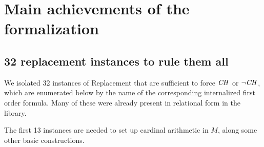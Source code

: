 \section{Main achievements of the formalization}
\label{sec:main-achievements}

\subsection{32 replacement instances to rule them all}
\label{sec:repl-instances}

We isolated 32 instances of Replacement that are sufficient to force
$\mathit{CH}$ or $\neg\mathit{CH}$, which are enumerated below by the name of the
corresponding internalized first order formula. Many of these were already present in
relational form in the  library.

The first 13 instances are needed to set up
cardinal arithmetic in $M$, along some other basic constructions.

